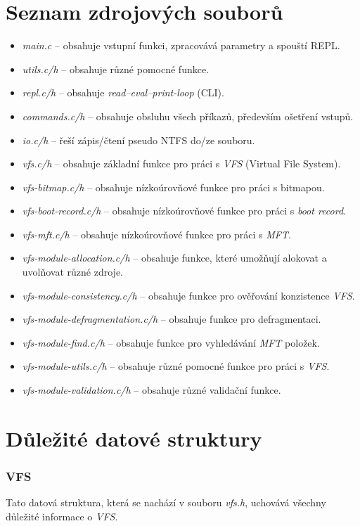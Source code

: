 \documentclass[12pt, a4paper]{report}
\begin{document}
\section{Seznam zdrojových souborů}
\begin{itemize}
	\item \emph{main.c} -- obsahuje vstupní funkci, zpracovává parametry a spouští REPL.
	\item \emph{utils.c/h} -- obsahuje různé pomocné funkce.
	\item \emph{repl.c/h} -- obsahuje \emph{read–eval–print-loop} (CLI).
	\item \emph{commands.c/h} -- obsahuje obsluhu všech příkazů, především ošetření vstupů.
	\item \emph{io.c/h} -- řeší zápis/čtení pseudo NTFS do/ze souboru.
	\item \emph{vfs.c/h} -- obsahuje základní funkce pro práci s \emph{VFS} (Virtual File System).
	\item \emph{vfs-bitmap.c/h} -- obsahuje nízkoúrovňové funkce pro práci s bitmapou.
	\item \emph{vfs-boot-record.c/h} -- obsahuje nízkoúrovňové funkce pro práci s \emph{boot record}.
	\item \emph{vfs-mft.c/h} -- obsahuje nízkoúrovňové funkce pro práci s \emph{MFT}.
	\item \emph{vfs-module-allocation.c/h} --  obsahuje funkce, které umožňují alokovat a uvolňovat různé zdroje.
	\item \emph{vfs-module-consistency.c/h} -- obsahuje funkce pro ověřování konzistence \emph{VFS}.
	\item \emph{vfs-module-defragmentation.c/h} -- obsahuje funkce pro defragmentaci.
	\item \emph{vfs-module-find.c/h} -- obsahuje funkce pro vyhledávání \emph{MFT} položek.
	\item \emph{vfs-module-utils.c/h} -- obsahuje různé pomocné funkce pro práci s \emph{VFS}.
	\item \emph{vfs-module-validation.c/h} -- obsahuje různé validační funkce.
\end{itemize}

\section{Důležité datové struktury}

\subsubsection*{VFS}
Tato datová struktura, která se nachází v souboru \emph{vfs.h}, uchovává všechny důležité informace o \emph{VFS}.
\end{document}
